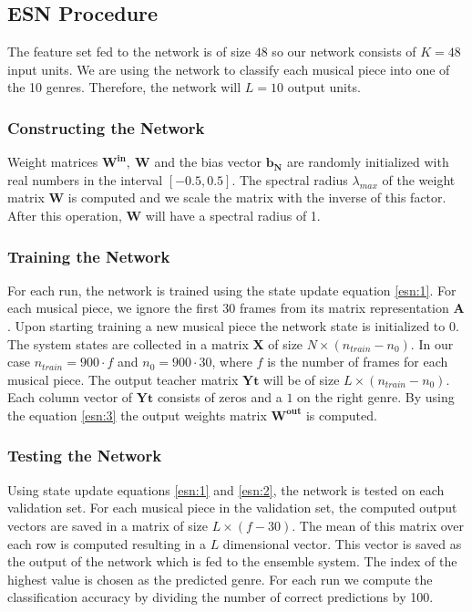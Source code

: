 \documentclass[a4paper,11pt,oneside]{article}
\begin{document}
\subsection{ESN Procedure}
The feature set fed to the network is of size $48$ so our network consists of $K=48$
input units. We are using the network to classify each musical piece into one of the 10 genres.
Therefore, the network will $L=10$ output units.
\subsubsection*{Constructing the Network}
Weight matrices $\mathbf{W^{in},\ W}$ and the bias vector $\mathbf{b_N}$ are randomly initialized with real numbers
in the interval $[-0.5,0.5]$. The spectral radius $\lambda_{max}$ of the weight matrix $\mathbf{W}$ is computed 
and we scale the matrix with the inverse of this factor. After this operation, $\mathbf{W}$ will have a spectral 
radius of 1.
\subsubsection*{Training the Network}
For each run, the network is trained using the state update equation \ref{esn:1}. For each musical piece, 
we ignore the first 30 frames from its matrix representation $\mathbf{A}$. Upon starting training a new musical 
piece the network state is initialized to $0$. The system states are collected in a matrix $\mathbf{X}$ of size 
$N\times (n_{train}-n_0)$. In our case $n_{train} = 900\cdot f$ and $n_0 = 900\cdot 30$, where $f$ is the number of 
frames for each musical piece. The output teacher matrix $\mathbf{Yt}$ will be of size $L\times (n_{train}-n_0)$. 
Each column vector of $\mathbf{Yt}$ consists of zeros and a $1$ on the right genre. By using the equation \ref{esn:3} 
the output weights matrix $\mathbf{W^{out}}$ is computed.
\subsubsection*{Testing the Network}\label{nettest}
Using state update equations \ref{esn:1} and \ref{esn:2}, the network is tested on each validation set.
For each musical piece in the validation set, the computed output vectors are saved in a matrix of size 
$L\times (f-30)$. The mean of this matrix over each row is computed resulting in a $L$ dimensional vector.
This vector is saved as the output of the network which is fed to the ensemble system.
The index of the highest value is chosen as the predicted genre. For each run we compute the classification accuracy
by dividing the number of correct predictions by 100. 
\end{document}
